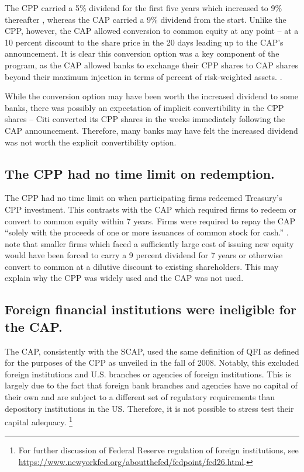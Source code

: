 \documentclass[12pt]{article}
\begin{document}
The CPP carried a 5\% dividend for the first five years which increased to 9\% thereafter , whereas the CAP carried a 9\% dividend from the start. Unlike the CPP, however, the CAP allowed conversion to common equity at any point -- at a 10 percent discount to the share price in the 20 days leading up to the CAP's announcement. It is clear this conversion option was a key component of the program, as the CAP allowed banks to exchange their CPP shares to CAP shares beyond their maximum injection in terms of percent of risk-weighted assets. \citep{GW}.

While the conversion option may have been worth the increased dividend to some banks, there was possibly an expectation of implicit convertibility in the CPP shares -- Citi converted its CPP shares in the weeks immediately following the CAP announcement. Therefore, many banks may have felt the increased dividend was not worth the explicit convertibility option.

\subsection{The CPP had no time limit on redemption.}

The CPP had no time limit on when participating firms redeemed Treasury's CPP investment. This contrasts with the CAP which required firms to redeem or convert to common equity within 7 years. Firms were required to repay the CAP ``solely with the proceeds of one or more issuances of common stock for cash.'' \citep{CAPTerms}. \citet{GW} note that smaller firms which faced a sufficiently large cost of issuing new equity would have been forced to carry a 9 percent dividend for 7 years or otherwise convert to common at a dilutive discount to existing shareholders. This may explain why the CPP was widely used and the CAP was not used. 

\subsection{Foreign financial institutions were ineligible for the CAP.}

The CAP, consistently with the SCAP, used the same definition of QFI as defined for the purposes of the CPP as unveiled in the fall of 2008. Notably, this excluded foreign institutions and U.S. branches or agencies of foreign institutions. This is largely due to the fact that foreign bank branches and agencies have no capital of their own and are subject to a different set of regulatory requirements than depository institutions in the US. Therefore, it is not possible to stress test their capital adequacy. \footnote{For further discussion of Federal Reserve regulation of foreign institutions, see \url{https://www.newyorkfed.org/aboutthefed/fedpoint/fed26.html}.}
\end{document}
